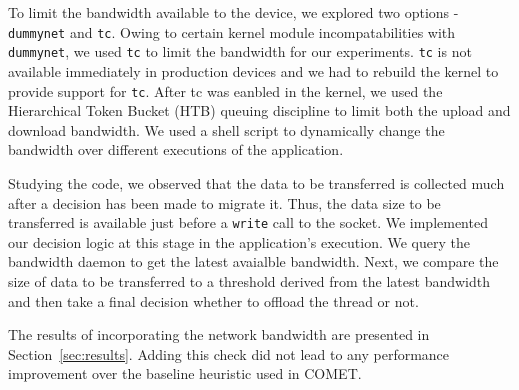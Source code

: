 To limit the bandwidth available to the device, we explored two options - \texttt{dummynet} and \texttt{tc}. Owing to certain kernel module incompatabilities with \texttt{dummynet}, we used \texttt{tc} to limit the bandwidth for our experiments. \texttt{tc} is not available immediately in production devices and we had to rebuild the kernel to provide support for \texttt{tc}. After tc was eanbled in the kernel, we used the Hierarchical Token Bucket (HTB) queuing discipline to limit both the upload and download bandwidth. We used a shell script to dynamically change the bandwidth over different executions of the application.

Studying the code, we observed that the data to be transferred is collected much after a decision has been made to migrate it. Thus, the data size to be transferred is available just before a \texttt{write} call to the socket. We implemented our decision logic at this stage in the application's execution. We query the bandwidth daemon to get the latest avaialble bandwidth. Next, we compare the size of data to be transferred to a threshold derived from the latest bandwidth and then take a final decision whether to offload the thread or not.

The results of incorporating the network bandwidth are presented in Section~\ref{sec:results}. Adding this check did not lead to any performance improvement
over the baseline heuristic used in COMET.
